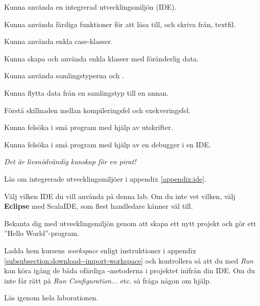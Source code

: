 


\Lab{\LabWeekFOUR}

\begin{Goals}
\item Kunna använda en integrerad utvecklingsmiljön (IDE).
\item Kunna använda färdiga funktioner för att läsa till, och skriva från, textfil.
\item Kunna använda enkla case-klasser.
\item Kunna skapa och använda enkla klasser med föränderlig data.
\item Kunna använda samlingstyperna  och .
\item Kunna flytta data från en samlingstyp till en annan.
\item Förstå skillnaden mellan kompileringsfel och exekveringsfel.
\item Kunna felsöka i små program med hjälp av utskrifter.
\item Kunna felsöka i små program med hjälp av en debugger i en IDE.
\end{Goals}

\begin{Preparations}
\item {} \emph{Det är livsnödvändig kunskap för en pirat!}
\item Läs om integrerade utvecklingsmiljöer i appendix \ref{appendix:ide}.
\item Välj vilken IDE du vill använda på denna lab. Om du inte vet vilken, välj \textbf{Eclipse} med ScalaIDE, som flest handledare känner väl till.
\item Bekanta dig med utvecklingsmiljön genom att skapa ett nytt projekt och gör ett ''Hello World''-program.
\item Ladda hem kursens \emph{workspace} enligt instruktioner i appendix \ref{subsubsection:download--import-workspace} och kontrollera så att du med \emph{Run} kan köra igång de båda ofärdiga -metoderna i projektet  inifrån din IDE. Om du inte får rätt på \emph{Run Configuration...} etc. så fråga någon om hjälp. 
\item Läs igenom hela laborationen.
\end{Preparations}


